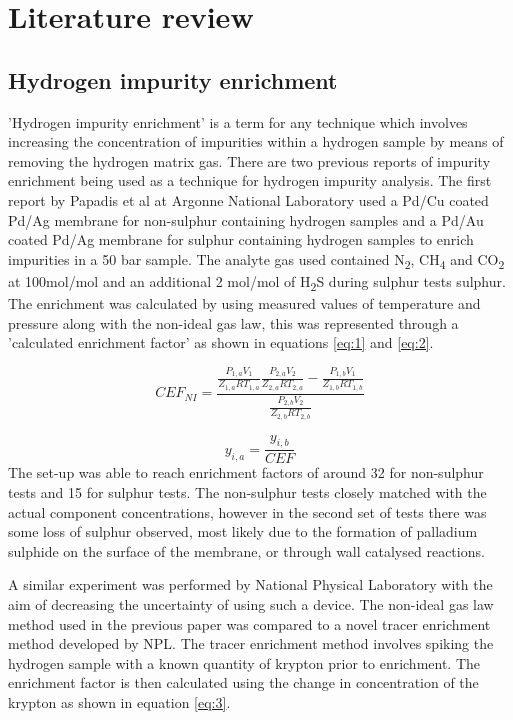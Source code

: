 
\chapter{Literature review}

\section{Hydrogen impurity enrichment}
'Hydrogen impurity enrichment' is a term for any technique which involves increasing the concentration of impurities within a hydrogen sample by means of removing the hydrogen matrix gas. There are two previous reports of impurity enrichment being used as a technique for hydrogen impurity 
analysis. The first report by Papadis et al at Argonne National Laboratory used a Pd/Cu \cite{Ahmed2010} coated Pd/Ag membrane for non-sulphur containing hydrogen samples and a Pd/Au coated Pd/Ag membrane for sulphur 
containing hydrogen samples to enrich impurities in a 50 bar sample. The analyte gas used contained N\textsubscript{2}, CH\textsubscript{4} and CO\textsubscript{2} at 100\textmu mol/mol and an additional 
 2 \textmu mol/mol of H\textsubscript{2}S during sulphur tests sulphur. 
The enrichment was calculated by using measured values of temperature and pressure along with the non-ideal gas law, this was represented through a 'calculated enrichment factor' as shown in equations \ref{eq:1}
and \ref{eq:2}. 

\begin{equation} \label{eq:1}
    CEF_{NI} = \frac{\frac{P_{1,a} V_1}{Z_{1,a}RT_{1,a}}\frac{P_{2,a} V_2}{Z_{2,a}RT_{2,a}}-\frac{P_{1,b} V_1}{Z_{1,b}RT_{1,b}}}{\frac{P_{2,b} V_2}{Z_{2,b}RT_{2,b}}}
\end{equation}

\begin{equation}\label{eq:2}
    y_{i,a} = \frac{y_{i,b}}{CEF}
\end{equation}
The set-up was able to reach enrichment factors of around 32 for non-sulphur tests and 15 
for sulphur tests. The non-sulphur tests closely matched with the actual component concentrations, 
however in the second set of tests there was some loss of sulphur observed, most likely due to the 
formation of palladium sulphide on the surface of the membrane, or through wall catalysed reactions. 

A similar experiment was performed by National Physical Laboratory with the aim of decreasing the uncertainty 
of using such a device. \cite{Murugan2014} The non-ideal gas law method used in the previous paper \cite{Ahmed2010} 
was compared to a novel tracer enrichment method developed by NPL. \cite{Murugan2014} 
The tracer enrichment method involves spiking the hydrogen sample with a known quantity of krypton prior to 
enrichment. The enrichment factor is then calculated using the change in concentration of the krypton as 
shown in equation \ref{eq:3}.

